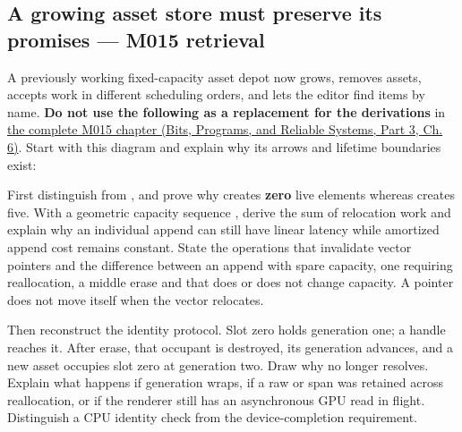 \subsection{A growing asset store must preserve its promises --- M015 retrieval}\label{appendix-960160274237-a-growing-asset-store-must-preserve-its-promises-m015-retrieval}

\hypertarget{appendix-960160274237-a-growing-asset-store-must-preserve-its-promises-m015-retrieval}{}

A previously working fixed-capacity asset depot now grows, removes assets, accepts work in different scheduling orders, and lets the editor find items by name. \textbf{Do not use the following as a replacement for the derivations} in \href{../01-Bits-Programs-and-Reliable-Systems-P03/main.pdf\#nameddest=01-foundations-i-ch006-an-asset-registry-grows-while-its-handles-must-not-change}{the complete M015 chapter (Bits, Programs, and Reliable Systems, Part 3, Ch. 6)}. Start with this diagram and explain why its arrows and lifetime boundaries exist:


First distinguish  from , and prove why  creates \textbf{zero} live elements whereas  creates five. With a geometric capacity sequence , derive the sum of relocation work and explain why an individual append can still have linear latency while amortized append cost remains constant. State the operations that invalidate vector pointers and the difference between an append with spare capacity, one requiring reallocation, a middle erase and  that does or does not change capacity. A pointer does not move itself when the vector relocates.

Then reconstruct the identity protocol. Slot zero holds generation one; a handle  reaches it. After erase, that occupant is destroyed, its generation advances, and a new asset occupies slot zero at generation two. Draw why  no longer resolves. Explain what happens if generation wraps, if a raw  or span was retained across reallocation, or if the renderer still has an asynchronous GPU read in flight. Distinguish a CPU identity check from the device-completion requirement.

